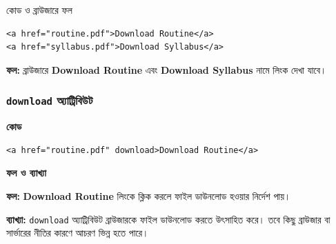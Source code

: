 \begin{chFourWholeExample}{কোড ও ব্রাউজারে ফল}
\noindent
\begin{minipage}[t]{.50\linewidth}\vspace{0pt}

\begin{verbatim}
<a href="routine.pdf">Download Routine</a>
<a href="syllabus.pdf">Download Syllabus</a>
\end{verbatim}

\end{minipage}\hfill
\begin{minipage}[t]{.46\linewidth}\vspace{0pt}
\textbf{ফল:} ব্রাউজারে \textbf{Download Routine} এবং \textbf{Download Syllabus} নামে লিংক দেখা যাবে।
\end{minipage}
\end{chFourWholeExample}

\subsubsection{\texttt{download} অ্যাট্রিবিউট}

\par\noindent
\begin{minipage}[t]{.54\linewidth}\vspace{0pt}\small
\textbf{\color{chFourTeal}কোড}\par
\begin{verbatim}
<a href="routine.pdf" download>Download Routine</a>
\end{verbatim}

\par\smallskip
\end{minipage}\hfill
\begin{minipage}[t]{.42\linewidth}\vspace{0pt}\small
\textbf{\color{chFourTeal}ফল ও ব্যাখ্যা}\par
\textbf{ফল:} \textbf{Download Routine} লিংকে ক্লিক করলে ফাইল ডাউনলোড হওয়ার নির্দেশ পায়।

\textbf{ব্যাখ্যা:} \texttt{download} অ্যাট্রিবিউট ব্রাউজারকে ফাইল ডাউনলোড করতে উৎসাহিত করে। তবে কিছু ব্রাউজার বা সার্ভারের নীতির কারণে আচরণ ভিন্ন হতে পারে।
\par\smallskip
\end{minipage}\par


